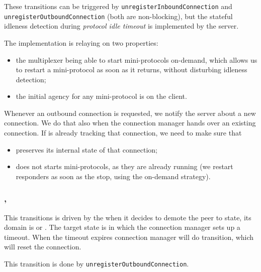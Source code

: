 \begin{detail}
  These transitions can be triggered by \texttt{unregisterInboundConnection} and
  \texttt{unregisterOutboundConnection} (both are non-blocking), but the
  stateful idleness detection during \textit{protocol idle timeout} is
  implemented by the server.

  The implementation is relaying on two properties:
  \begin{itemize}
    \item the multiplexer being able to start mini-protocols on-demand, which
      allows us to restart a mini-protocol as soon as it returns, without
      disturbing idleness detection;
    \item the initial agency for any mini-protocol is on the client.
  \end{itemize}
\end{detail}

\begin{detail}
  Whenever an outbound connection is requested, we notify the server about
  a new connection.  We do that also when the connection manager hands over an
  existing connection.  If \inbgov{} is already tracking that connection,
  we need to make sure that
  \begin{itemize}
    \item \inbgov{} preserves its internal state of that connection;
    \item \inbgov{} does not starts mini-protocols, as they are already running
      (we restart responders as soon as the stop, using the on-demand
      strategy).
  \end{itemize}
\end{detail}


\subsubsection{\DemotedToColdUniLoc{}, \DemotedToColdDupLoc{}}
This transitions is driven by the \ptopgov{} when it decides to demote the peer
to \cold{} state, its domain is \OutboundStateAny{} or \OutboundStateDupTau{}.
The target state is \OutboundIdleStateAny{} in which the connection manager
sets up a timeout.  When the timeout expires connection manager will do
\CommitAnyLoc{} transition, which will reset the connection.

\begin{detail}
This transition is done by \texttt{unregisterOutboundConnection}.
\end{detail}


